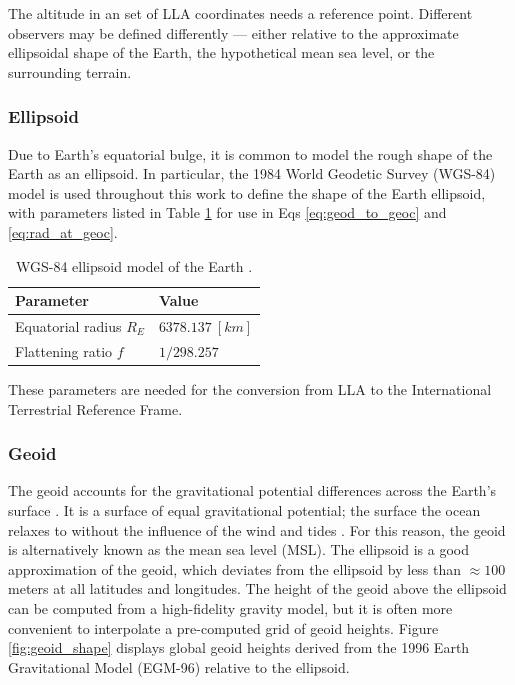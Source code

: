 The altitude in an set of LLA coordinates needs a reference point. Different observers may be defined differently --- either relative to the approximate ellipsoidal shape of the Earth, the hypothetical mean sea level, or the surrounding terrain.

\subsubsection{Ellipsoid}

Due to Earth's equatorial bulge, it is common to model the rough shape of the Earth as an ellipsoid. In particular, the 1984 World Geodetic Survey (WGS-84) model is used throughout this work to define the shape of the Earth ellipsoid, with parameters listed in Table \ref{tb:wgs84} for use in Eqs \ref{eq:geod_to_geoc} and \ref{eq:rad_at_geoc}.

\begin{table}[ht]
  \centering
  \begin{tabular}{|l|l|}
  \hline
  \textbf{Parameter} & \textbf{Value}              \\ \hline
  Equatorial radius $R_E$             & $6378.137 \: [km]$ \\ \hline
  Flattening ratio $f$                & $1 / 298.257$      \\ \hline
  \end{tabular}
  \caption{WGS-84 ellipsoid model of the Earth \cite{vallado4ed}.}
  \label{tb:wgs84}
\end{table}

These parameters are needed for the conversion from LLA to the International Terrestrial Reference Frame.

\subsubsection{Geoid}

The geoid accounts for the gravitational potential differences across the Earth's surface \cite{vallado4ed}. It is a surface of equal gravitational potential; the surface the ocean relaxes to without the influence of the wind and tides \cite{vallado4ed}. For this reason, the geoid is alternatively known as the mean sea level (MSL). The ellipsoid is a good approximation of the geoid, which deviates from the ellipsoid by less than $\approx 100$ meters at all latitudes and longitudes. The height of the geoid above the ellipsoid can be computed from a high-fidelity gravity model, but it is often more convenient to interpolate a pre-computed grid of geoid heights. Figure \ref{fig:geoid_shape} displays global geoid heights derived from the 1996 Earth Gravitational Model (EGM-96) relative to the ellipsoid.

